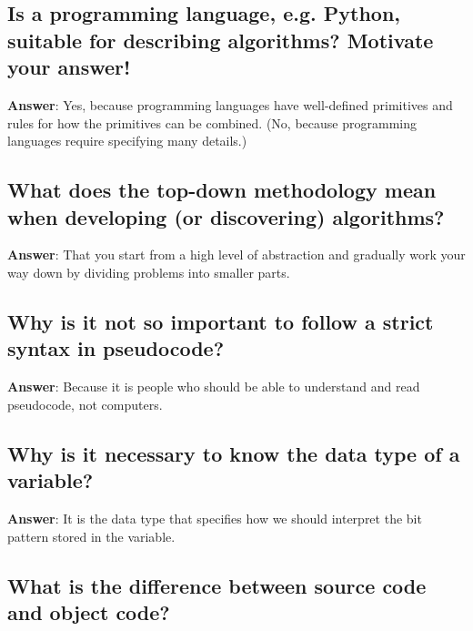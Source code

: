 \documentclass[a4paper,11pt,oneside]{article}
\begin{document}
\begin{sloppypar}
\subsection{Is a programming language, e.g. Python, suitable for describing algorithms? Motivate your answer!}

\label{q:188:sa:en:True}

\textbf{Answer}: Yes, because programming languages have well-defined primitives and rules for how the primitives can be combined. (No, because programming languages require specifying many details.)



\subsection{What does the top-down methodology mean when developing (or discovering) algorithms?}

\label{q:189:sa:en:True}

\textbf{Answer}: That you start from a high level of abstraction and gradually work your way down by dividing problems into smaller parts.



\subsection{Why is it not so important to follow a strict syntax in pseudocode?}

\label{q:190:sa:en:True}

\textbf{Answer}: Because it is people who should be able to understand and read pseudocode, not computers.



\subsection{Why is it necessary to know the data type of a variable?}

\label{q:191:sa:en:True}

\textbf{Answer}: It is the data type that specifies how we should interpret the bit pattern stored in the variable.



\subsection{What is the difference between source code and object code?}

\label{q:192:sa:en:True}


\end{sloppypar}
\end{document}
